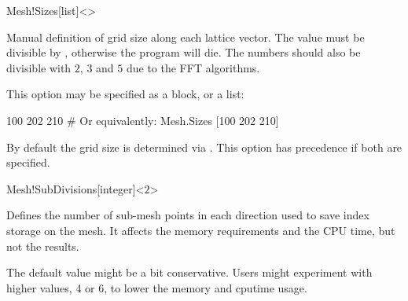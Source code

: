 \begin{fdfentry}{Mesh!Sizes}[list]<>

  Manual definition of grid size along each lattice vector. The value
  must be divisible by , otherwise the
  program will die. The numbers should also be divisible with $2$, $3$
  and $5$ due to the FFT algorithms.

  This option may be specified as a block, or a list:
  \begin{fdfexample}
      100 202 210
    # Or equivalently:
    Mesh.Sizes [100 202 210]  
  \end{fdfexample}

  By default the grid size is determined via . This
  option has precedence if both are specified.

\end{fdfentry}

\begin{fdfentry}{Mesh!SubDivisions}[integer]<$2$>
  
  Defines the number of sub-mesh points in each direction used
  to save index storage on the mesh. It affects the memory
  requirements and the CPU time, but not the results. 

  \note The default value might be a bit conservative. Users might
  experiment with higher values, 4 or 6, to lower the memory and
  cputime usage.

\end{fdfentry}


